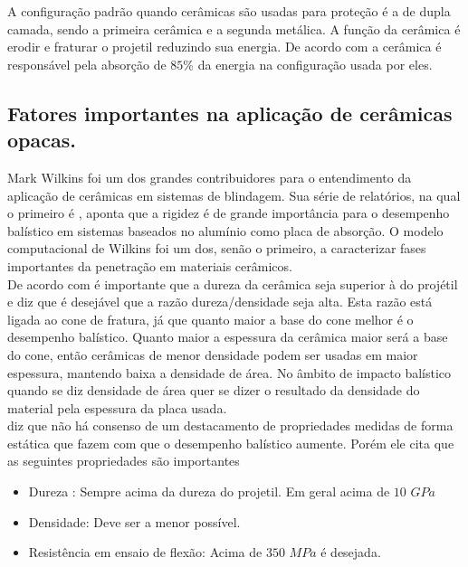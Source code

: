 A configuração padrão quando cerâmicas são usadas para proteção é a de dupla camada, sendo a primeira cerâmica e a segunda metálica. A função da cerâmica é erodir e fraturar o projetil reduzindo sua energia. De acordo com \cite{neckel_hotza_stainer_janssen_al-qureshi_2013} a cerâmica é responsável pela absorção de $85\%$ da energia na configuração usada por eles. \\

\subsection{Fatores importantes na aplicação de cerâmicas opacas.}

Mark Wilkins foi um dos grandes contribuidores para o entendimento da aplicação de cerâmicas em sistemas de blindagem. Sua série de relatórios, na qual o primeiro é \cite{firstreport}, aponta que a rigidez é de grande importância para o desempenho balístico em sistemas baseados no alumínio como placa de absorção. O modelo computacional de Wilkins foi um dos, senão o primeiro, a caracterizar fases importantes da penetração em materiais cerâmicos. \\

De acordo com \cite{reijel} é importante que a dureza da cerâmica seja superior à do projétil e \cite{Crouch} diz que é desejável que a razão dureza/densidade seja alta. Esta razão está ligada ao cone de fratura, já que quanto maior a base do cone melhor é o desempenho balístico. Quanto maior a espessura da cerâmica maior será a base do cone, então cerâmicas de menor densidade podem ser usadas em maior espessura, mantendo baixa a densidade de área. No âmbito de impacto balístico quando se diz densidade de área quer se dizer o resultado da densidade do material pela espessura da placa usada.  \\

\cite{Crouch} diz que não há consenso de um destacamento de propriedades medidas de forma estática que fazem com que o desempenho balístico aumente. Porém ele cita que as seguintes propriedades são importantes

\begin{itemize}
    \item Dureza : Sempre acima da dureza do projetil. Em geral acima de $10$ $GPa$
    \item Densidade: Deve ser a menor possível.
    \item Resistência em ensaio de flexão: Acima de $350$ $MPa$ é desejada.
\end{itemize}

